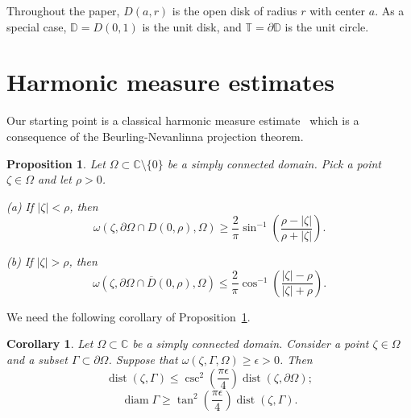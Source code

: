 \documentclass[11pt]{amsart}
\newtheorem{corollary}[theorem]{Corollary}
\newtheorem{proposition}[theorem]{Proposition}
\theoremstyle{remark}
\numberwithin{equation}{section}
\newcommand{\C}{\mathbb{C}}
\newcommand{\DD}{\mathbb{D}}
\newcommand{\T}{\mathbb{T}}
\newcommand{\abs}[1]{\lvert#1\rvert}
\DeclareMathOperator{\dist}{dist}
\DeclareMathOperator{\diam}{diam}
\begin{document}
Throughout the paper, $D(a,r)$ is the open disk of radius $r$ with center $a$. As a special case, $\DD = D(0,1)$ is the unit disk, and $\T = \partial \DD$ is the unit circle. 

\section{Harmonic measure estimates}\label{harmestsec}

Our starting point is a classical harmonic measure estimate~\cite[Corollary 4.5.9]{Ranb} which is a consequence of
the Beurling-Nevanlinna projection theorem.

\begin{proposition}\label{BNprop} Let $\Omega\subset \C\setminus \{0\}$ be a simply connected domain. Pick a point
$\zeta\in\Omega$ and let $\rho>0$.

(a) If $\abs{\zeta}<\rho$, then
\begin{equation}\label{BN1}
\omega(\zeta,\partial \Omega\cap D(0,\rho), \Omega)\ge \frac{2}{\pi}\sin^{-1}\left(\frac{\rho-\abs{\zeta}}{\rho+\abs{\zeta}}\right).
\end{equation}

(b) If $\abs{\zeta}>\rho$, then
\begin{equation}\label{BN2}
\omega(\zeta,\partial \Omega\cap \overline{D}(0,\rho), \Omega)\le \frac{2}{\pi}\cos^{-1}\left(\frac{\abs{\zeta}-\rho}{\abs{\zeta}+\rho}\right).
\end{equation}
\end{proposition}

We need the following corollary of Proposition~\ref{BNprop}.

\begin{corollary}\label{BNcor} Let $\Omega\subset \C$ be a simply connected domain. Consider a point $\zeta \in \Omega$ and a subset $\Gamma\subset \partial \Omega$. Suppose that $\omega(\zeta,\Gamma,\Omega)\ge \epsilon>0$. Then 
\begin{equation}\label{BNcor1}
\dist(\zeta,\Gamma) \le \csc^2 \left(\frac{\pi \epsilon}{4}\right) \dist(\zeta,\partial\Omega);
\end{equation}
\begin{equation}\label{BNcor2}
\diam \Gamma \ge \tan^2 \left(\frac{\pi \epsilon}{4} \right) \dist(\zeta,\Gamma).
\end{equation}
\end{corollary}
\end{document}
